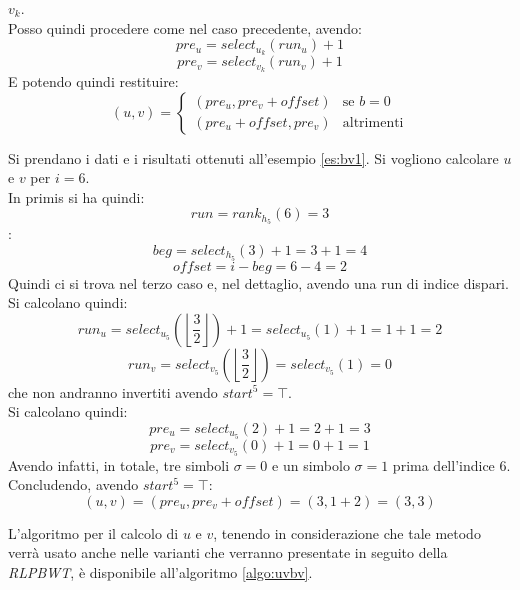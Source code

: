 \begin{enumerate}
\begin{enumerate}
    $v_k$.\\ 
    Posso quindi procedere come nel caso precedente, avendo:
    \begin{equation}
      \label{eq:bv18}
      pre_u=select_{u_k}(run_u)+1
    \end{equation}
    \begin{equation}
      \label{eq:bv19}
      pre_v=select_{v_k}(run_v)+1
    \end{equation}
    E potendo quindi restituire:
    \begin{equation}
      \label{eq:bv20}
      (u,v)=
      \begin{cases}
        (pre_u,pre_v+offset)&\mbox{se } b=0\\
        (pre_u+offset,pre_v)&\mbox{altrimenti}
      \end{cases}
    \end{equation}
  \end{enumerate}
\end{enumerate}
\begin{esempio}
  Si prendano i dati e i risultati ottenuti all'esempio \ref{es:bv1}. Si
  vogliono calcolare $u$ e $v$ per $i=6$.\\
  In primis si ha quindi:
  \[run=rank_{h_5}(6)=3\]:
  \[beg = select_{h_5}(3)+1=3+1=4\]
  \[offset = i-beg=6-4=2\]
  Quindi ci si trova nel terzo caso e, nel dettaglio, avendo una run di
  indice dispari. Si calcolano quindi:
  \[run_u=select_{u_5}\left(\left\lfloor\frac{3}{2}\right\rfloor\right)+1=
    select_{u_5}(1)+1
    =1+1=2\] 
  \[run_v=select_{v_5}\left(\left\lfloor\frac{3}{2}\right\rfloor\right)=
    select_{v_5}(1)=0\] 
  che non andranno invertiti avendo $start^5=\top$.\\
  Si calcolano quindi:
  \[pre_u=select_{u_5}(2)+1=2+1=3\]
  \[pre_v=select_{v_5}(0)+1=0+1=1\]
  Avendo infatti, in totale, tre simboli $\sigma=0$ e un simbolo $\sigma=1$
  prima dell'indice 6.\\ 
  Concludendo, avendo $start^5=\top$:
  \[(u,v)=(pre_u, pre_v + offset)=(3,1+2)=(3,3)\]
\end{esempio}
L'algoritmo per il calcolo di $u$ e $v$, tenendo in considerazione che tale
metodo verrà usato anche nelle varianti che verranno presentate in seguito della
\textit{RLPBWT}, è disponibile all'algoritmo \ref{algo:uvbv}.